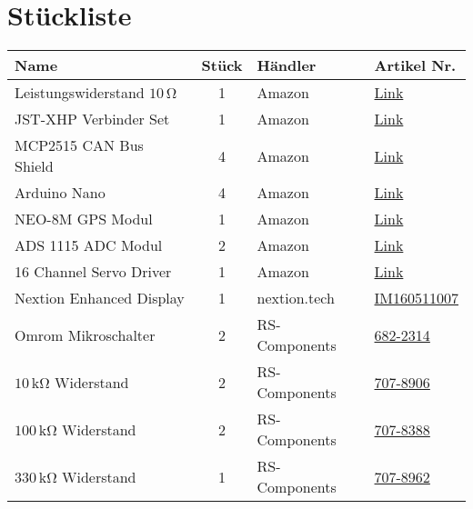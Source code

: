 \section{Stückliste}
\begin{table}[h]
    \centering
    \begin{threeparttable}
    \begin{tabular}{|l|c|M{3cm}|l|}
        \hline
    Name                         & Stück & Händler & Artikel Nr. \\\hline
    Leistungswiderstand $10\,\mathrm{\Omega}$ & 1 & Amazon & \href{https://www.amazon.de/-/en/sourcing-Aluminum-Housing-Mounted-Resistor/dp/B07H25VYM4/}{Link}\\
    JST-XHP Verbinder Set& 1 & Amazon & \href{https://www.amazon.de/dp/B07Q171W48/ref=cm_sw_r_cp_awdb_imm_t1_POHzFbSN8KAB1}{Link}\\ 
    MCP2515 CAN Bus Shield & 4 & Amazon & \href{https://www.amazon.de/-/en/AZDelivery-MCP2515-Shield-compatible-Arduino/dp/B086V3HLQ4}{Link}\\
    Arduino Nano           & 4 & Amazon & \href{https://www.amazon.de/gp/product/B078SBBST6}{Link}\\
    NEO-8M GPS Modul & 1 & Amazon & \href{https://www.amazon.de/-/en/gp/product/B07SQJ7Q6X}{Link}\\
    ADS 1115 ADC Modul & 2 & Amazon & \href{https://www.amazon.de/AZDelivery-ADS1115-Channels-Arduino-Raspberry/dp/B07QHWLTTS}{Link}\\
    16 Channel Servo Driver & 1 & Amazon & \href{https://www.amazon.de/Allrounder-PCA9685-Sunflower-16-Channel-Arduino-Raspberry/dp/B014KTSMLA}{Link}\\\hline
    Nextion Enhanced Display & 1 & nextion.tech & \href{https://www.itead.cc/nextion-nx8048k050.html}{IM160511007}\\\hline
    Omrom Mikroschalter & 2 & RS-Components & \href{https://at.rs-online.com/web/p/detektorschalter/6822314/}{682-2314}\\
    $10\,\mathrm{k\Omega}$ Widerstand & 2 & RS-Components &\href{https://at.rs-online.com/web/p/widerstande-durchsteckmontage/7078906/}{707-8906}\\
    $100\,\mathrm{k\Omega}$ Widerstand & 2 & RS-Components &\href{https://at.rs-online.com/web/p/widerstande-durchsteckmontage/7078388/}{707-8388}\\
    $330\,\mathrm{k\Omega}$ Widerstand & 1 & RS-Components &\href{https://at.rs-online.com/web/p/widerstande-durchsteckmontage/7078962/}{707-8962}\\

\end{tabular}
\end{threeparttable}
\end{table}
